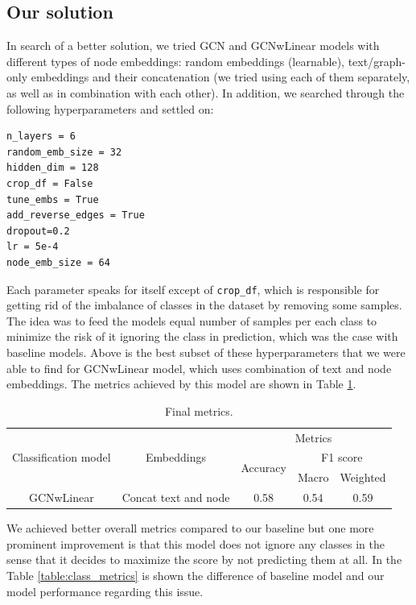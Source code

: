 \documentclass{article}
\newcommand\tab[1][1cm]{\hspace*{#1}}
\begin{document}
\subsection{Our solution}
\tab In search of a better solution, we tried GCN and GCNwLinear models with different types of node embeddings: random embeddings (learnable), text/graph-only embeddings and their concatenation (we tried using each of them separately, as well as in combination with each other). In addition, we searched through the following hyperparameters and settled on:
\begin{verbatim}
n_layers = 6
random_emb_size = 32
hidden_dim = 128
crop_df = False
tune_embs = True
add_reverse_edges = True
dropout=0.2
lr = 5e-4
node_emb_size = 64
\end{verbatim}
Each parameter speaks for itself except of \texttt{crop\_df}, which is responsible for getting rid of the imbalance of classes in the dataset by removing some samples. The idea was to feed the models equal number of samples per each class to minimize the risk of it ignoring the class in prediction, which was the case with baseline models. Above is the best subset of these hyperparameters that we were able to find for GCNwLinear model, which uses combination of text and node embeddings. The metrics achieved by this model are shown in Table \ref{table:final_metrics}.

\begin{table}[h]
\centering
\begin{tabular}{c c  c c c}
\hline\hline
 & & \multicolumn{3}{c}{Metrics} \\
\cline{3-5}
Classification model & Embeddings & \multirow{2}{*}{Accuracy} & \multicolumn{2}{c}{F1 score} \\
 & & & Macro & Weighted \\
\hline
\multirow{1}{*}{GCNwLinear} & Concat text and node & 0.58 & 0.54 & 0.59 \\
\hline
\end{tabular}
\caption{Final metrics.}
\label{table:final_metrics}
\end{table}

We achieved better overall metrics compared to our baseline but one more prominent improvement is that this model does not ignore any classes in the sense that it decides to maximize the score by not predicting them at all. In the Table \ref{table:class_metrics} is shown the difference of baseline model and our model performance regarding this issue.
\end{document}
